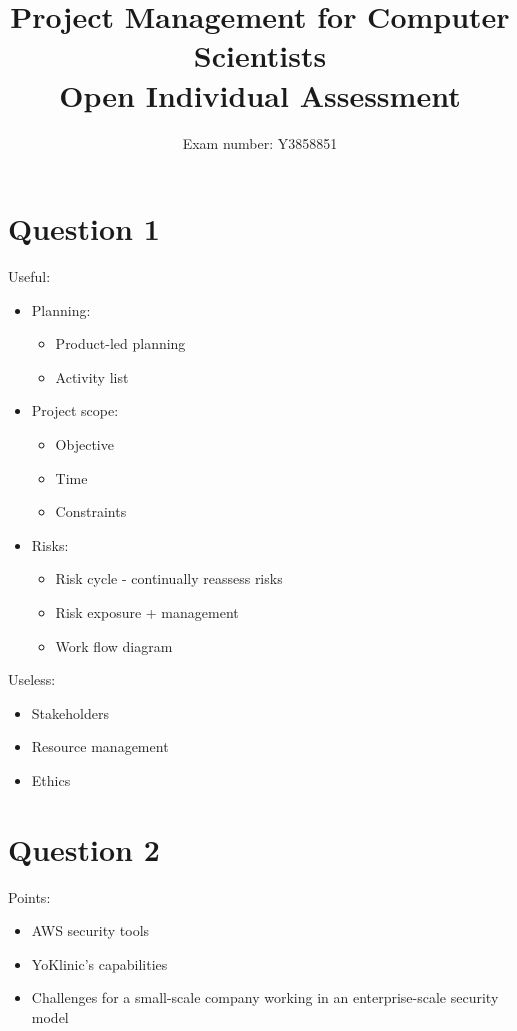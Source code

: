 \documentclass[12pt]{article}
\begin{document}
\title{Project Management for Computer Scientists\\
\vspace{5mm}
\Large Open Individual Assessment}
\author{Exam number: Y3858851}
\date{}
\maketitle

\section*{Question 1} 
Useful:
\begin{itemize}
    \item Planning:
    \begin{itemize}
        \item Product-led planning
        \item Activity list
    \end{itemize}

    \item Project scope:
    \begin{itemize}
        \item Objective
        \item Time
        \item Constraints
    \end{itemize}

    \item Risks:
    \begin{itemize}
        \item Risk cycle \-- continually reassess risks
        \item Risk exposure + management
        \item Work flow diagram
    \end{itemize}
\end{itemize}
Useless:
\begin{itemize}
    \item Stakeholders
    \item Resource management
    \item Ethics
\end{itemize}
\section*{Question 2}
Points:
\begin{itemize}
    \item AWS security tools
    \item YoKlinic's capabilities
    \item Challenges for a small-scale company working in an enterprise-scale security model
\end{itemize}
\end{document}
